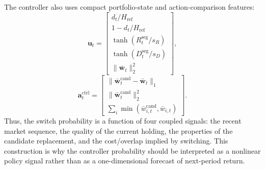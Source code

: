 \documentclass[letterpaper]{article} %
\begin{document}
The controller also uses compact portfolio-state and action-comparison features:
\[
\mathbf{u}_t=
\begin{bmatrix}
d_t/H_{\mathrm{ref}}\\
1-d_t/H_{\mathrm{ref}}\\
\tanh(R_t^{\mathrm{seg}}/s_R)\\
\tanh(D_t^{\mathrm{seg}}/s_D)\\
\|\bar{\mathbf{w}}_t\|_2^2
\end{bmatrix},
\]
\[
\mathbf{a}^{\mathrm{ctrl}}_t=
\begin{bmatrix}
\|\bar{\mathbf{w}}^{\mathrm{cand}}_t-\bar{\mathbf{w}}_t\|_1\\
\|\bar{\mathbf{w}}^{\mathrm{cand}}_t\|_2^2\\
\sum_i \min(\bar{w}^{\mathrm{cand}}_{i,t},\bar{w}_{i,t})
\end{bmatrix}.
\]
Thus, the switch probability is a function of four coupled signals: the recent market sequence, the quality of the current holding, the properties of the candidate replacement, and the cost/overlap implied by switching. This construction is why the controller probability should be interpreted as a nonlinear policy signal rather than as a one-dimensional forecast of next-period return.
\end{document}
